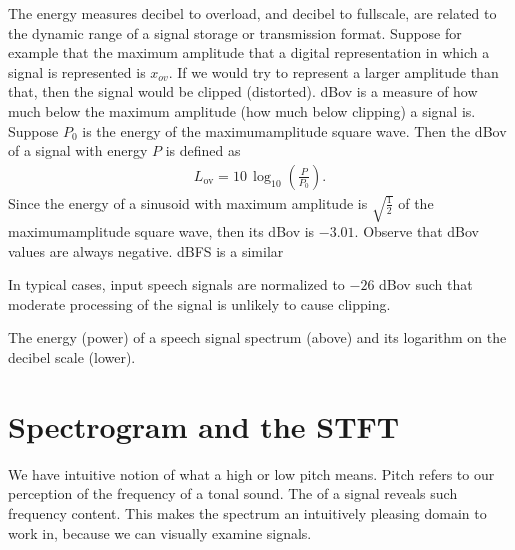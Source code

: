 \documentclass[letterpaper,10pt,english]{jupyterBook}
\begin{document}
\sphinxAtStartPar
The energy measures decibel to overload,  and decibel to
full\sphinxhyphen{}scale,  are related to the dynamic range of a signal storage
or transmission format. Suppose for example that the maximum amplitude
that a digital representation in which a signal is represented is
\(x_{ov}\). If we would try to represent a larger amplitude than
that, then the signal would be clipped (distorted). dBov is a measure of
how much below the maximum amplitude (how much below clipping) a signal
is. Suppose \(P_{0}\) is the energy of the maximum\sphinxhyphen{}amplitude
square wave. Then the dBov of a signal with energy \(P\) is defined as
\begin{equation*}
\begin{split} L_{\text{ov}}=10\,\log _{10}\left({\frac
{P}{P_{0}}}\right). \end{split}
\end{equation*}
\sphinxAtStartPar
Since the energy of a sinusoid with maximum amplitude is \(\sqrt{\frac12}\) of the maximum\sphinxhyphen{}amplitude square wave, then its dBov
is \(-3.01\). Observe that dBov values are always negative. dBFS is a
similar

\sphinxAtStartPar
In typical cases, input speech signals are normalized to \(-26\) dBov such
that moderate processing of the signal is unlikely to cause clipping.

\sphinxAtStartPar
{}

\sphinxAtStartPar
The energy (power) of a speech signal spectrum (above) and its logarithm
on the decibel scale (lower).

\sphinxstepscope


\section{Spectrogram and the STFT}
\label{\detokenize{Representations/Spectrogram_and_the_STFT:spectrogram-and-the-stft}}\label{\detokenize{Representations/Spectrogram_and_the_STFT::doc}}
\sphinxAtStartPar
We have intuitive notion of what a high or low pitch means. Pitch refers
to our perception of the frequency of a tonal sound. The
 of
a signal reveals such frequency content. This makes the spectrum an
intuitively pleasing domain to work in, because we can visually examine
signals.
\end{document}
